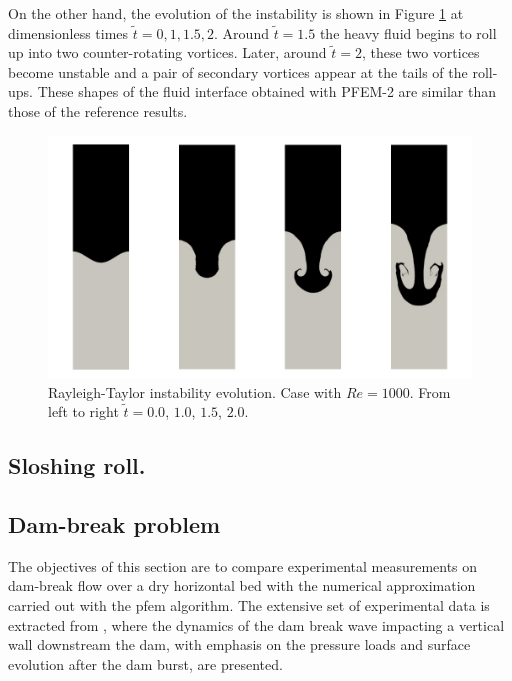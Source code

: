 \documentclass[a4paper,conference]{IEEEtran}
\begin{document}
On the other hand, the evolution of the instability is shown in Figure \ref{fg:rayleigh-screenshots} at dimensionless times $\widetilde{t}=0, 1, 1.5, 2$. Around $\widetilde{t}=1.5$ the heavy fluid begins to roll up into two counter-rotating vortices. Later, around $\widetilde{t} = 2$, these two vortices become unstable and a pair of secondary vortices appear at the tails of the roll-ups. These shapes of the fluid interface obtained with PFEM-2 are similar than those of the reference results.


\begin{figure}[htbp]
  \begin{center}
      \includegraphics[width=\columnwidth]{images/rayleigh_2.jpg}
  \end{center}
  \caption{\label{fg:rayleigh-screenshots} Rayleigh-Taylor instability evolution. Case with $Re=1000$. From left to right $\widetilde{t} =0.0$, $1.0$, $1.5$, $2.0$.}
\end{figure}

\subsection{Sloshing roll.}%

\subsection{Dam-break problem}%

The objectives of this section are to compare experimental measurements on dam-break flow over a dry horizontal bed with the numerical approximation carried out with the pfem algorithm. The extensive set of experimental data is extracted from \cite{Lobovsky13}, where the dynamics of the dam break wave impacting a vertical wall downstream the dam, with emphasis on the pressure loads and surface evolution after the dam burst, are presented.
\end{document}
